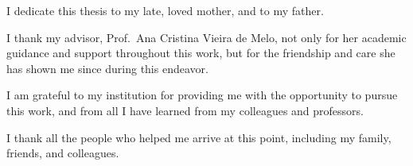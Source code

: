 \newpage

I dedicate this thesis to my late, loved mother, and to my father.

\vspace{1em}

I thank my advisor, Prof.\ Ana Cristina Vieira de Melo, not only for her academic guidance and support throughout this work, but for the friendship and care she has shown me since during this endeavor.

I am grateful to my institution for providing me with the opportunity to pursue this work, and from all I have learned from my colleagues and professors.

I thank all the people who helped me arrive at this point, including my family, friends, and colleagues.